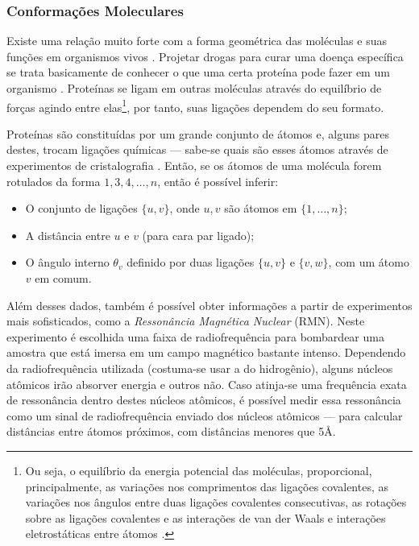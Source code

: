 \subsubsection{Conformações Moleculares}

Existe uma relação muito forte com a forma geométrica das moléculas e suas funções em organismos vivos \cite{bioquimicaLehninger}. Projetar drogas para curar uma doença específica se trata basicamente de conhecer o que uma certa proteína pode fazer em um organismo \cite{libertiEDG}. Proteínas se ligam em outras moléculas através do equilíbrio de forças agindo entre elas\footnote{Ou seja, o equilíbrio da energia potencial das moléculas, proporcional, principalmente, as variações nos comprimentos das ligações covalentes, as variações nos ângulos entre duas ligações covalentes consecutivas, as rotações sobre as ligações covalentes e as interações de van der Waals e interações eletrostáticas entre átomos \cite{carlileTese}.}, por tanto, suas ligações dependem do seu formato. 

Proteínas são constituídas por um grande conjunto de átomos e, alguns pares destes, trocam ligações químicas --- sabe-se quais são esses átomos através de experimentos de cristalografia \cite{ramachandran1974MolStructure}. Então, se os átomos de uma molécula forem rotulados da forma $1,3,4,\dots,n$, então é possível inferir: 
\begin{itemize}
	\item O conjunto de ligações $\{u,v\}$, onde $u,v$ são átomos em $\{1,\dots,n\}$;
	\item A distância entre $u$ e $v$ (para cara par ligado);
	\item O ângulo interno $\theta_v$ definido por duas ligações $\{u,v\}$ e $\{v,w\}$, com um átomo $v$ em comum.
\end{itemize} 

Além desses dados, também é possível obter informações a partir de experimentos mais sofisticados, como a \textit{Ressonância Magnética Nuclear} (RMN). Neste experimento é escolhida uma faixa de radiofrequência para bombardear uma amostra que está imersa em um campo magnético bastante intenso. Dependendo da radiofrequência utilizada (costuma-se usar a do hidrogênio), alguns núcleos atômicos irão absorver energia e outros não. Caso atinja-se uma frequência exata de ressonância dentro destes núcleos atômicos, é possível medir essa ressonância como um sinal de radiofrequência enviado dos núcleos atômicos --- para calcular distâncias entre átomos próximos, com distâncias menores que 5\AA.

